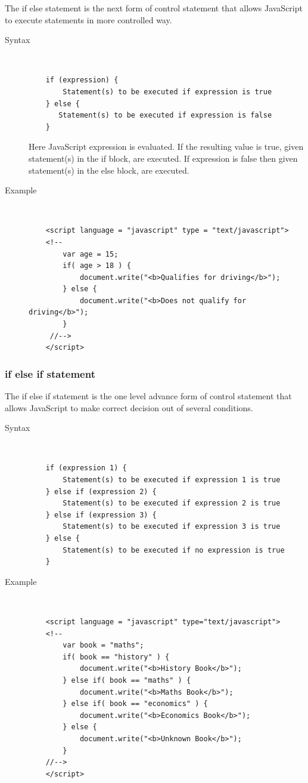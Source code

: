 \documentclass[11pt,a4paper]{article}
\begin{document}
The if else statement is the next form of control statement that allows JavaScript to execute statements in more controlled way.
\begin{description}
\item[Syntax]\

\begin{verbatim}
    if (expression) {
        Statement(s) to be executed if expression is true
    } else {
       Statement(s) to be executed if expression is false
    }
\end{verbatim}

Here JavaScript expression is evaluated. If the resulting value is true, given statement(s) in the if block, are executed. If expression is false then given statement(s) in the else block, are executed.

\item[Example]\

\begin{verbatim}
    <script language = "javascript" type = "text/javascript">
    <!--
        var age = 15;
        if( age > 18 ) {
            document.write("<b>Qualifies for driving</b>");
        } else {
            document.write("<b>Does not qualify for driving</b>");
        }
     //-->
    </script>
\end{verbatim}
\end{description}

\subsubsection*{if else if  statement}

The if else if statement is the one level advance form of control statement that allows JavaScript to make correct decision out of several conditions.

\begin{description}
\item[Syntax]\

\begin{verbatim}
    if (expression 1) {
        Statement(s) to be executed if expression 1 is true
    } else if (expression 2) {
        Statement(s) to be executed if expression 2 is true
    } else if (expression 3) {
        Statement(s) to be executed if expression 3 is true
    } else {
        Statement(s) to be executed if no expression is true
    }
\end{verbatim}

\item[Example]\

\begin{verbatim}
    <script language = "javascript" type="text/javascript">
    <!--
        var book = "maths";
        if( book == "history" ) {
            document.write("<b>History Book</b>");
        } else if( book == "maths" ) {
            document.write("<b>Maths Book</b>");
        } else if( book == "economics" ) {
            document.write("<b>Economics Book</b>");
        } else {
            document.write("<b>Unknown Book</b>");
        }
    //-->
    </script>
\end{verbatim}
\end{description}
\end{document}

